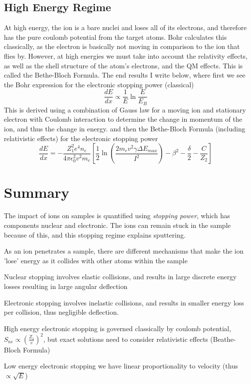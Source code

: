 \subsection{High Energy Regime}\label{subsec:high-energy-regime}
At high energy, the ion is a bare nuclei and loses all of its electrons, and therefore has the pure coulomb potential from the target atoms.
Bohr calculates this classically, as the electron is basically not moving in comparison to the ion that flies by.
However, at high energies we must take into account the relativity effects, as well as the shell structure of the atom's electrons, and the QM effects.
This is called the Bethe-Bloch Formula.
The end results I write below, where first we see the Bohr expression for the electronic stopping power (classical)
\begin{equation}
	\frac{dE}{dx} \propto \frac{1}{E} \ln \frac{E}{E_B}\label{eq:borh}
\end{equation}
This is derived using a combination of Gauss law for a moving ion and stationary electron with Coulomb interaction to determine the change in momentum of the ion, and thus the change in energy.
and then the Bethe-Bloch Formula (including relativistic effects) for the electronic stopping power
\begin{equation}
	\frac{dE}{dx} = -\frac{Z_1^2 e^4 n_e}{4\pi \epsilon_0^2 v^2 m_e}\left[ \frac{1}{2} \ln \left( \frac{2m_e v^2 \gamma \Delta E_{max}}{I^2}\right) - \beta^2 - \frac{\delta}{2} - \frac{C}{Z_2}\right]\label{eq:beathe}
\end{equation}

\section{Summary}\label{sec:summary4}
The impact of ions on samples is quantified using \textit{stopping power}, which has components nuclear and electronic.
The ions can remain stuck in the sample because of this, and this stopping regime explains sputtering.
\begin{myitemize}
	\item As an ion penetrates a sample, there are different mechanisms that make the ion 'lose' energy as it collides with other atoms within the sample
	\item Nuclear stopping involves elastic collisions, and results in large discrete energy losses resulting in large angular deflection
	\item Electronic stopping involves inelastic collisions, and results in smaller energy loss per collision, thus negligible deflection.
	\item High energy electronic stopping is governed classically by coulomb potential, $S_{ne} \propto \left( \frac{Z_1}{v}\right)^2$, but exact solutions need to consider relativistic effects (Beathe-Bloch Formula)
	\item Low energy electronic stopping we have linear proportionality to velocity (thus $\propto \sqrt{E}$)
\end{myitemize}
